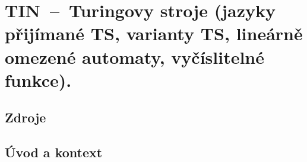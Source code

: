 

\graphicspath{{tin/chomskeho_hierarchie/figures}}


\chapter{TIN~--~Turingovy stroje (jazyky přijímané TS, varianty TS, lineárně omezené automaty, vyčíslitelné funkce).}


\section{Zdroje}

\begin{compactitem}
    \item {}
    \item {}
\end{compactitem}


\section{Úvod a kontext}

